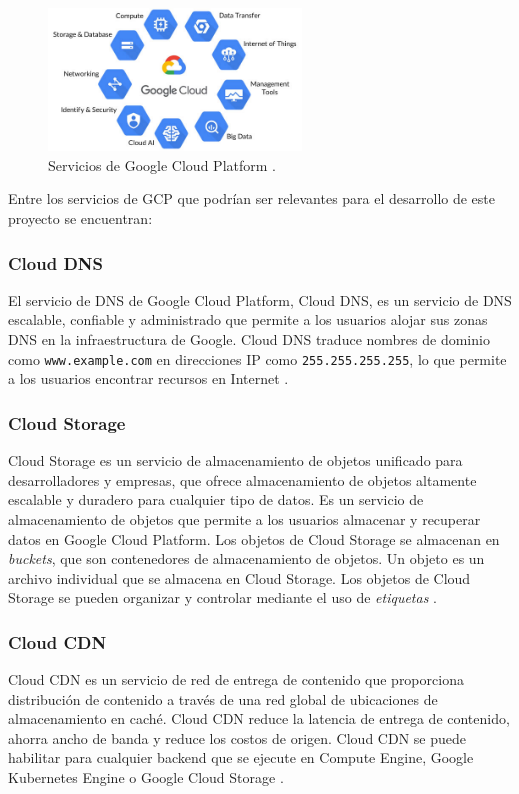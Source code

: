 \begin{figure}[!htbp]
  \centering
  \includegraphics[width=0.6\textwidth]{imagenes/02-marco-teorico/google-cloud-platform-services.jpg}
  \caption[Servicios de Google Cloud Platform]{Servicios de Google Cloud Platform \cite{geewax2018google}.}
  \label{fig:gcp}
\end{figure}

Entre los servicios de GCP que podrían ser relevantes para el desarrollo de
este proyecto se encuentran:

\subsubsection{Cloud DNS}
El servicio de DNS de Google Cloud Platform, Cloud DNS, es un servicio de DNS
escalable, confiable y administrado que permite a los usuarios alojar sus zonas
DNS en la infraestructura de Google. Cloud DNS traduce nombres de dominio como
\texttt{www.example.com} en direcciones IP como \texttt{255.255.255.255}, lo que
permite a los usuarios encontrar recursos en Internet \cite{geewax2018google}.

\subsubsection{Cloud Storage}
Cloud Storage es un servicio de almacenamiento de objetos unificado para desarrolladores
y empresas, que ofrece almacenamiento de objetos altamente escalable y duradero
para cualquier tipo de datos. Es un servicio de almacenamiento de objetos que
permite a los usuarios almacenar y recuperar datos en Google Cloud Platform.
Los objetos de Cloud Storage se almacenan en \textit{buckets}, que son contenedores
de almacenamiento de objetos. Un objeto es un archivo individual que se almacena
en Cloud Storage. Los objetos de Cloud Storage se pueden organizar y controlar
mediante el uso de \textit{etiquetas} \cite{geewax2018google}.

\subsubsection{Cloud CDN}
Cloud CDN es un servicio de red de entrega de contenido que proporciona
distribución de contenido a través de una red global de ubicaciones de
almacenamiento en caché. Cloud CDN reduce la latencia de entrega de contenido,
ahorra ancho de banda y reduce los costos de origen. Cloud CDN se puede habilitar
para cualquier backend que se ejecute en Compute Engine, Google Kubernetes Engine
o Google Cloud Storage \cite{geewax2018google}.

